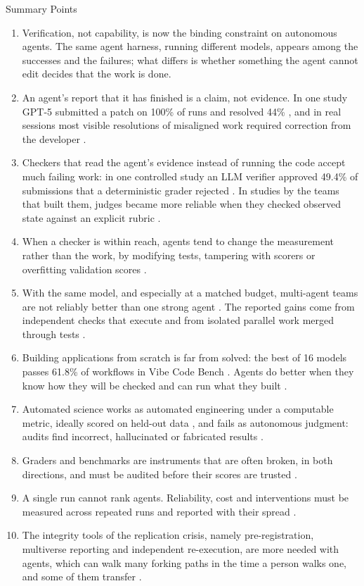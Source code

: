 \begin{arbox}{Summary Points}
\begin{enumerate}[leftmargin=*,itemsep=2pt]
\item Verification, not capability, is now the binding constraint on autonomous agents. The same agent harness, running different models, appears among the successes and the failures; what differs is whether something the agent cannot edit decides that the work is done.
\item An agent's report that it has finished is a claim, not evidence. In one study GPT-5 submitted a patch on 100\% of runs and resolved 44\% \citep{F20}, and in real sessions most visible resolutions of misaligned work required correction from the developer \citep{T23}.
\item Checkers that read the agent's evidence instead of running the code accept much failing work: in one controlled study an LLM verifier approved 49.4\% of submissions that a deterministic grader rejected \citep{T18}. In studies by the teams that built them, judges became more reliable when they checked observed state against an explicit rubric \citep{V15,V29}.
\item When a checker is within reach, agents tend to change the measurement rather than the work, by modifying tests, tampering with scorers or overfitting validation scores \citep{V3,V17,R26}.
\item With the same model, and especially at a matched budget, multi-agent teams are not reliably better than one strong agent \citep{T18,T25,T9}. The reported gains come from independent checks that execute and from isolated parallel work merged through tests \citep{T4,T20}.
\item Building applications from scratch is far from solved: the best of 16 models passes 61.8\% of workflows in Vibe Code Bench \citep{C19}. Agents do better when they know how they will be checked and can run what they built \citep{C29}.
\item Automated science works as automated engineering under a computable metric, ideally scored on held-out data \citep{S31,A25}, and fails as autonomous judgment: audits find incorrect, hallucinated or fabricated results \citep{S9,S15,S16}.
\item Graders and benchmarks are instruments that are often broken, in both directions, and must be audited before their scores are trusted \citep{C15,V31,D13}.
\item A single run cannot rank agents. Reliability, cost and interventions must be measured across repeated runs and reported with their spread \citep{F19,F24}.
\item The integrity tools of the replication crisis, namely pre-registration, multiverse reporting and independent re-execution, are more needed with agents, which can walk many forking paths in the time a person walks one, and some of them transfer \citep{R1,R6,R19}.
\end{enumerate}
\end{arbox}

